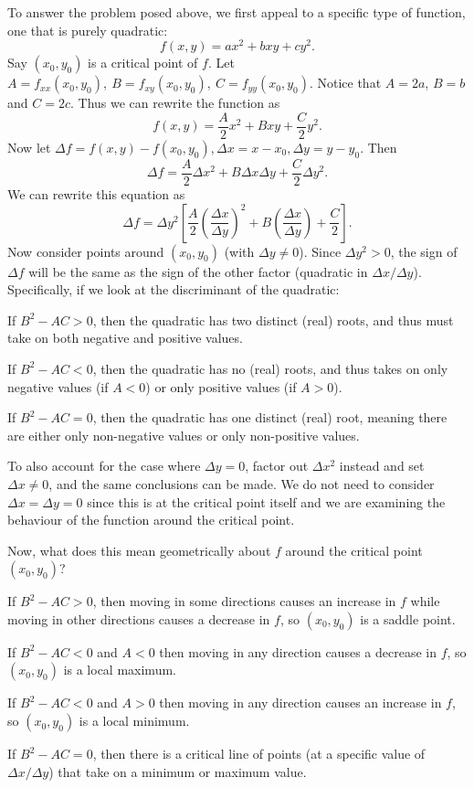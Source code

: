 To answer the problem posed above, we first appeal to a specific type of function, one that is purely quadratic:
\[ f(x,y) = ax^2 + bxy + cy^2. \]
Say $(x_0,y_0)$ is a critical point of $f$. Let $A = f_{xx}(x_0,y_0),\ B=f_{xy}(x_0,y_0),\ C=f_{yy}(x_0,y_0)$. Notice that $A=2a$, $B=b$ and $C=2c$. Thus we can rewrite the function as
\[ f(x,y)= \frac A2 x^2 + Bxy + \frac C2 y^2. \]
Now let $\Delta f = f(x,y)-f(x_0,y_0), \Delta x = x-x_0, \Delta y = y-y_0$. Then
\[ \Delta f = \frac A2 \Delta x^2 + B\Delta x \Delta y + \frac C2 \Delta y^2. \]
We can rewrite this equation as 
\[ \Delta f = \Delta y^2 \left[\frac A2 \left(\frac{\Delta x}{\Delta y}\right)^2 + B\left(\frac{\Delta x}{\Delta y}\right) + \frac C2 \right]. \]
Now consider points around $(x_0,y_0)$ (with $\Delta y \ne 0$). Since $\Delta y^2 > 0$, the sign of $\Delta f$ will be the same as the sign of the other factor (quadratic in $\Delta x / \Delta y$). Specifically, if we look at the discriminant of the quadratic: 
\bit
\item If $B^2 - AC > 0$, then the quadratic has two distinct (real) roots, and thus must take on both negative and positive values.
\item If $B^2 - AC < 0$, then the quadratic has no (real) roots, and thus takes on only negative values (if $A < 0$) or only positive values (if $A > 0$).
\item If $B^2 - AC = 0$, then the quadratic has one distinct (real) root, meaning there are either only non-negative values or only non-positive values. 
\eit

\brm
To also account for the case where $\Delta y = 0$, factor out $\Delta x ^2$ instead and set $\Delta x \ne 0$, and the same conclusions can be made. We do not need to consider $\Delta x = \Delta y = 0$ since this is at the critical point itself and we are examining the behaviour of the function around the critical point.
\erm

Now, what does this mean geometrically about $f$ around the critical point $(x_0,y_0)$?
\bit
\item If $B^2 - AC > 0$, then moving in some directions causes an increase in $f$ while moving in other directions causes a decrease in $f$, so $(x_0,y_0)$ is a saddle point.
\item If $B^2 - AC < 0$ and $A < 0$ then moving in any direction causes a decrease in $f$, so $(x_0,y_0)$ is a local maximum. 
\item If $B^2 - AC < 0$ and $A > 0$ then moving in any direction causes an increase in $f$, so $(x_0,y_0)$ is a local minimum.
\item If $B^2 - AC = 0$, then there is a critical line of points (at a specific value of $\Delta x / \Delta y$) that take on a  minimum or maximum value. 
\eit

